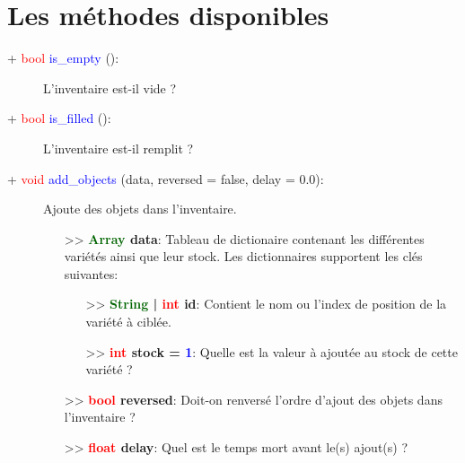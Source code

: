 \documentclass[a4paper, 11pt]{article}
\begin{document}
	\section{Les méthodes disponibles}
	\begin{description}
		\item [+ \textcolor{red}{bool} \textcolor{blue}{is\_empty} ():] L'inventaire est-il vide ?\\
	\end{description}
	\begin{description}
		\item [+ \textcolor{red}{bool} \textcolor{blue}{is\_filled} ():] L'inventaire est-il remplit ?\\
	\end{description}
	\begin{description}
		\item [+ \textcolor{red}{void} \textcolor{blue}{add\_objects} (data, reversed = false, delay = 
		0.0):] Ajoute des objets dans l'inventaire.
		\begin{itemize}
			\item [>> \textbf{\textcolor{darkgreen}{Array} data}:] Tableau de dictionaire contenant les 
			différentes variétés ainsi que leur stock. Les dictionnaires supportent les clés suivantes:
			\begin{itemize}
				\item[>> \textbf{\textcolor{darkgreen}{String} | \textcolor{red}{int} id}:] Contient le 
				nom ou l'index de position de la variété à ciblée.
				\item[>> \textbf{\textcolor{red}{int} stock = \textcolor{blue}{1}}:] Quelle est la valeur à 
				ajoutée au stock de cette variété ?
			\end{itemize}
			\item [>> \textbf{\textcolor{red}{bool} reversed}:] Doit-on renversé l'ordre d'ajout des objets
			dans l'inventaire ?
			\item [>> \textbf{\textcolor{red}{float} delay}:] Quel est le temps mort avant le(s) ajout(s) ?
			\\
		\end{itemize}
	\end{description}
\end{document}
